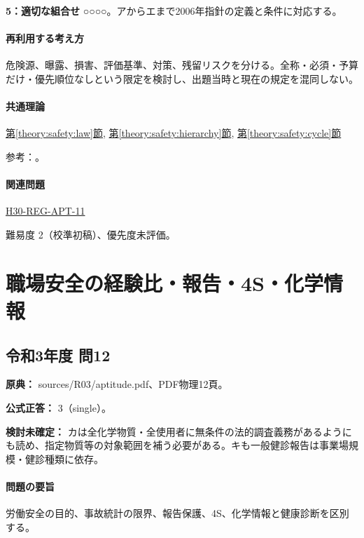 \noindent\textbf{5：適切な組合せ} ○○○○。アからエまで2006年指針の定義と条件に対応する。\par

\paragraph{再利用する考え方} 危険源、曝露、損害、評価基準、対策、残留リスクを分ける。全称・必須・予算だけ・優先順位なしという限定を検討し、出題当時と現在の規定を混同しない。

\paragraph{共通理論} \hyperref[theory:safety:law]{第\ref*{theory:safety:law}節}, \hyperref[theory:safety:hierarchy]{第\ref*{theory:safety:hierarchy}節}, \hyperref[theory:safety:cycle]{第\ref*{theory:safety:cycle}節}

\par 参考：\cite{saf_ra2006}。

\paragraph{関連問題} \hyperref[q:h30-reg-apt-11]{H30-REG-APT-11}

\par 難易度 2（校準初稿）、優先度未評価。

\section{職場安全の経験比・報告・4S・化学情報}

\subsection{令和3年度 問12}
\label{q:r03-reg-apt-12}

\noindent\textbf{原典：} sources/R03/aptitude.pdf、PDF物理12頁。

\textbf{公式正答：} 3（single）。

\par\textbf{検討未確定：} カは全化学物質・全使用者に無条件の法的調査義務があるようにも読め、指定物質等の対象範囲を補う必要がある。キも一般健診報告は事業場規模・健診種類に依存。

\paragraph{問題の要旨} 労働安全の目的、事故統計の限界、報告保護、4S、化学情報と健康診断を区別する。

